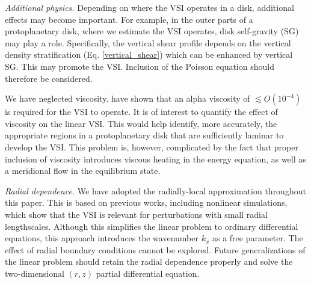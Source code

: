 \emph{Additional physics.} Depending on where the VSI operates in a
disk, additional effects may become important. For example, in the
outer parts of a protoplanetary disk, where we estimate the VSI 
operates, disk self-gravity (SG) may play a role. Specifically, the vertical
shear profile depends on the vertical density stratification
(Eq. \ref{vertical_shear}) which can be enhanced by vertical SG. This
may promote the VSI. Inclusion of the Poisson equation should
therefore be considered.  

We have neglected viscosity. \cite{nelson13} have shown that an
alpha viscosity of $\lesssim O(10^{-4})$ is required for the VSI to
operate. It is of interest to quantify the effect of viscosity
on the linear VSI. This would help identify, more accurately, the
appropriate regions in a protoplanetary disk that are sufficiently
laminar to develop the VSI.  This problem is, however, complicated by
the fact that proper inclusion of viscosity introduces viscous heating
in the energy equation, as well as a meridional flow in the equilibrium state.  


\emph{Radial dependence.} We have adopted the radially-local approximation 
throughout this paper. This is based on previous works, including
nonlinear simulations, which show that the VSI is relevant for
perturbations with small radial lengthscales. Although this simplifies
the linear problem to ordinary differential equations, this approach
introduces the wavenumber $k_x$ as a free parameter. The effect
of radial boundary conditions cannot be explored. Future
generalizations of the linear problem should retain the radial
dependence properly and solve the two-dimensional $(r,z)$ partial 
differential equation.     





